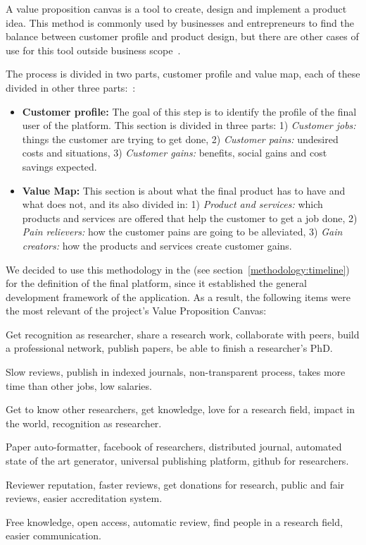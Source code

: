 
A value proposition canvas is a tool to create, design and implement a product
idea. This method is commonly used by businesses and entrepreneurs to find the
balance between customer profile and product design, but there are other cases
of use for this tool outside business
scope~\cite{pokorna2015value,meertens2012mapping}.

The process is divided in two parts, customer profile and value map, each of
these divided in other three parts:~\cite{osterwalder2014value}:

\begin{itemize}
\item \textbf{Customer profile:} The goal of this step is to identify the profile of the
  final user of the platform. This section is divided in three parts: 1)
  \emph{Customer jobs:} things the customer are trying to get done, 2)
  \emph{Customer pains:} undesired costs and situations, 3) \emph{Customer
    gains:} benefits, social gains and cost savings expected.
\item \textbf{Value Map:} This section is about what the final product has to
  have and what does not, and its also divided in: 1) \emph{Product and
    services:} which products and services are offered that help the customer
 to get a job done, 2) \emph{Pain relievers:} how the customer pains are going to
  be alleviated, 3) \emph{Gain creators:} how the products and services create
  customer gains.
\end{itemize}

We decided to use this methodology in the (see
section~\ref{methodology:timeline}) for the definition of the final platform,
since it established the general development framework of the application. As a
result, the following items were the most relevant of the project's Value
Proposition Canvas:

\begin{itemize}
   Get recognition as researcher, share a research work,
  collaborate with peers, build a professional network, publish papers, be able
  to finish a researcher's PhD.

   Slow reviews, publish in indexed journals,
  non-transparent process, takes more time than other jobs, low salaries.

   Get to know other researchers, get knowledge, love for
  a research field, impact in the world, recognition as researcher.

   Paper auto-formatter, facebook of researchers,
  distributed journal, automated state of the art generator, universal
  publishing platform, github for researchers.

   Reviewer reputation, faster reviews, get donations for
  research, public and fair reviews, easier accreditation system.

   Free knowledge, open access, automatic review, find
  people in a research field, easier communication.
\end{itemize}

